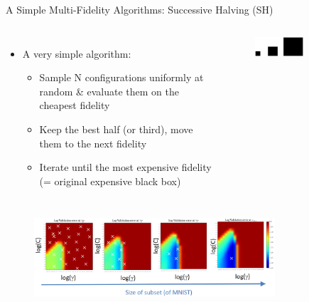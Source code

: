 



\begin{frame}{A Simple Multi-Fidelity Algorithms: Successive Halving (SH)}
\vskip -10pt
\hskip 270pt

\begin{columns}

    \begin{itemize}
        \item A very simple algorithm:
        \begin{itemize}
            \item Sample N configurations uniformly at random \& evaluate them on the cheapest fidelity
            \item Keep the best half (or third), move them to the next fidelity
            \item Iterate until the most expensive fidelity (= original expensive black box)
        \end{itemize}
    \end{itemize}
    
    \begin{figure}
        \centering
        \includegraphics[width=0.6\textwidth]{w07_hpo_grey_box/images/hyperband/black_blocks.png}
    \end{figure}

\end{columns}

\begin{figure}
    \centering
    \includegraphics[width=0.8\textwidth]{w07_hpo_grey_box/images/hyperband/hyperband_fidelities.png}
\end{figure}
    
\end{frame}

